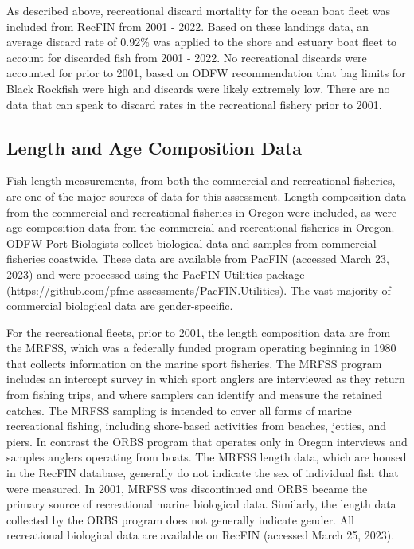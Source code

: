 \documentclass[11pt,
  english,
  letterpaper,
]{article}
\begin{document}
As described above, recreational discard mortality for the ocean boat fleet was included from RecFIN from 2001 - 2022. Based on these landings data, an average discard rate of 0.92\% was applied to the shore and estuary boat fleet to account for discarded fish from 2001 - 2022. No recreational discards were accounted for prior to 2001, based on ODFW recommendation that bag limits for Black Rockfish were high and discards were likely extremely low. There are no data that can speak to discard rates in the recreational fishery prior to 2001.

\hypertarget{length-and-age-composition-data}{%
\subsection{Length and Age Composition Data}\label{length-and-age-composition-data}}

Fish length measurements, from both the commercial and recreational fisheries, are one of the major sources of data for this assessment. Length composition data from the commercial and recreational fisheries in Oregon were included, as were age composition data from the commercial and recreational fisheries in Oregon. ODFW Port Biologists collect biological data and samples from commercial fisheries coastwide. These data are available from PacFIN (accessed March 23, 2023) and were processed using the PacFIN Utilities package (\url{https://github.com/pfmc-assessments/PacFIN.Utilities}). The vast majority of commercial biological data are gender-specific.

For the recreational fleets, prior to 2001, the length composition data are from the MRFSS, which was a federally funded program operating beginning in 1980 that collects information on the marine sport fisheries. The MRFSS program includes an intercept survey in which sport anglers are interviewed as they return from fishing trips, and where samplers can identify and measure the retained catches. The MRFSS sampling is intended to cover all forms of marine recreational fishing, including shore-based activities from beaches, jetties, and piers. In contrast the ORBS program that operates only in Oregon interviews and samples anglers operating from boats. The MRFSS length data, which are housed in the RecFIN database, generally do not indicate the sex of individual fish that were measured. In 2001, MRFSS was discontinued and ORBS became the primary source of recreational marine biological data. Similarly, the length data collected by the ORBS program does not generally indicate gender. All recreational biological data are available on RecFIN (accessed March 25, 2023).
\end{document}
